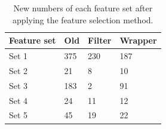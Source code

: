 \documentclass[USenglish]{ifimaster}  %
\begin{document}
\begin{table}[h]
	\centering
	\begin{tabular}{llll}
		\hline
		\textbf{Feature set} & \textbf{Old} & \textbf{Filter} & \textbf{Wrapper} \\ \hline
		Set 1 & 375 & 230 & 187 \\
		Set 2 & 21 & 8 & 10 \\
		Set 3 & 183 & 2 & 91 \\
		Set 4 & 24 & 11 & 12 \\
		Set 5 & 45 & 19 & 22 \\ \hline
	\end{tabular}
	\caption[Numbers of each feature set after the feature selection method]{New numbers of each feature set after applying the feature selection method.}
	\label{tab:exp2_1}
\end{table}
\FloatBarrier
\end{document}
